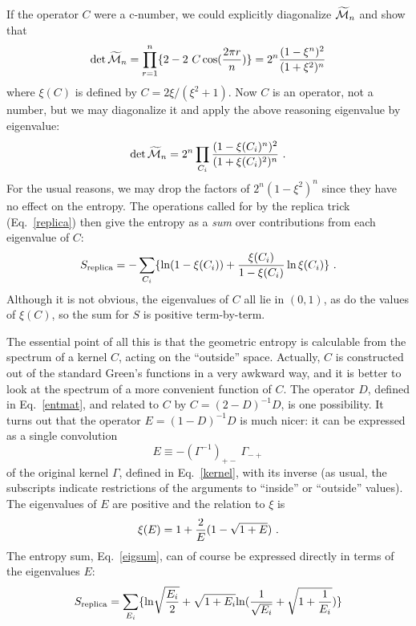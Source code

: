\documentclass[12pt]{article}
\begin{document}
If the operator $C$ were a c-number, we could explicitly diagonalize
$\widetilde{\cal M}_n$ and show that
\begin{equation}
\det {\widetilde{\cal M}_n} =\prod_{r=1}^n\{2-2~C \cos({2\pi r\over n})\}
		= 2^n{(1 - \xi^n)^2 \over (1+\xi^2)^n}
\end{equation}
where $\xi(C)$ is defined by $C = 2\xi /( \xi^2 +1)$.
Now $C$ is an operator, not a number, but we may diagonalize it
and apply the above reasoning eigenvalue by eigenvalue:
\begin{equation}
\det {\widetilde{\cal M}_n} = 2^n\prod_{C_i}{(1 - \xi(C_i)^n)^2 \over
		(1+\xi(C_i)^2)^n}~.
\end{equation}
For the usual reasons, we may drop the factors of $2^n(1-\xi^2)^n$ since
they have no effect on the entropy. The operations called for by the replica
trick (Eq.~\ref{replica}) then give the entropy as
a {\it sum} over contributions from each eigenvalue of $C$:
\begin{equation}
S_{\rm replica} = -\sum_{C_i}\{\ln(1-\xi(C_i)) +
{\xi(C_i)\over 1-\xi(C_i)} \ln\xi(C_i)\}~.
\label{eigsum}
\end{equation}
Although it is not obvious, the eigenvalues of $C$ all lie in $(0,1)$,
as do the values of $\xi(C)$, so the sum for $S$ is positive term-by-term.

The essential point of all this is that the geometric entropy is calculable
from the spectrum of a kernel $C$, acting on the ``outside'' space. Actually,
$C$ is constructed out of the standard Green's functions in a very awkward
way, and it is better to look at the spectrum of a more convenient function of
$C$. The operator $D$, defined in Eq.~\ref{entmat}, and related to $C$ by
$C=(2-D)^{-1}D$, is one possibility. It turns out that the operator
$E=(1-D)^{-1}D$ is much nicer: it can be expressed as a single convolution
\begin{equation}
E \equiv -(\Gamma^{-1})_{+-}~\Gamma_{-+}
\label{newker}
\end{equation}
of the original kernel $\Gamma$,
defined in Eq.~\ref{kernel}, with its inverse (as usual, the subscripts
indicate restrictions of the arguments to ``inside'' or ``outside'' values).
The eigenvalues of $E$ are positive and the relation to $\xi$ is
\begin{equation}
\xi(E) = 1+ {2\over E}(1-\sqrt{1+E})~.
\end{equation}
The entropy sum, Eq.~\ref{eigsum}, can of course be expressed directly in terms
of the eigenvalues $E$:
\begin{equation}
S_{\rm replica} = \sum_{E_i}
\{{\rm \ln}\sqrt{{E_i\over 2}}+\sqrt{1+E_i}
{\rm \ln}({1\over\sqrt{E_i}}+\sqrt{1+
{1\over E_i}})  \}
\label{entsum}
\end{equation}
\end{document}
